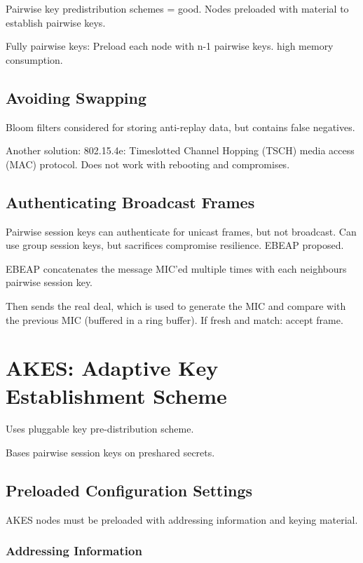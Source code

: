 \documentclass[10pt]{article}
\begin{document}
Pairwise key predistribution schemes = good. Nodes preloaded with material to establish pairwise keys.

Fully pairwise keys: Preload each node with n-1 pairwise keys. high memory consumption.

\subsection{Avoiding Swapping}

Bloom filters considered for storing anti-replay data, but contains false negatives. 

Another solution: 802.15.4e: Timeslotted Channel Hopping (TSCH) media access (MAC) protocol. Does not work with rebooting and compromises.

\subsection{Authenticating Broadcast Frames}

Pairwise session keys can authenticate for unicast frames, but not broadcast. Can use group session keys, but sacrifices compromise resilience. EBEAP proposed.

EBEAP concatenates the message MIC'ed multiple times with each neighbours pairwise session key.

Then sends the real deal, which is used to generate the MIC and compare with the previous MIC (buffered in a ring buffer). If fresh and match: accept frame.


\section{AKES: Adaptive Key Establishment Scheme}

Uses pluggable key pre-distribution scheme.

Bases pairwise session keys on preshared secrets.


\subsection{Preloaded Configuration Settings}

AKES nodes must be preloaded with addressing information and keying material.

\subsubsection{Addressing Information}
\end{document}
